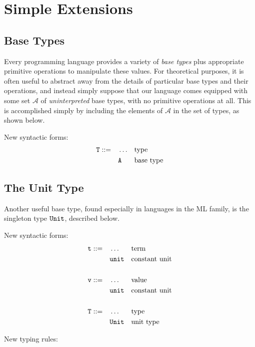 \documentclass[11pt,twoside=off,numbers=noenddot]{scrbook}
\begin{document}
\chapter{Simple Extensions}

\section{Base Types}
Every programming language provides a variety of \textit{base types}
plus appropriate primitive operations to manipulate these values. For
theoretical purposes, it is often useful to abstract away from the
details of particular base types and their operations, and instead
simply suppose that our language comes equipped with some set
$\mathcal{A}$ of \textit{uninterpreted} base types, with no primitive
operations at all. This is accomplished simply by including the
elements of $\mathcal{A}$ in the set of types, as shown below.

New syntactic forms:
\begin{align*}
  \ttt{T} ::= & \quad \dots && \text{type} \\
  & \quad \ttt{A} && \text{base type}
\end{align*}

\section{The Unit Type}
Another useful base type, found especially in languages in the ML
family, is the singleton type $\ttt{Unit}$, described below.

New syntactic forms:
\begin{align*}
  \ttt{t} ::= & \quad \dots && \text{term} \\
  & \quad \ttt{unit} && \text{constant unit} \\
  \\
  \ttt{v} ::= & \quad \dots && \text{value} \\
  & \quad \ttt{unit} && \text{constant unit} \\
  \\
  \ttt{T} ::= & \quad \dots && \text{type} \\
  & \quad \ttt{Unit} && \text{unit type}
\end{align*}

New typing rules:
\begin{prooftree}
\end{prooftree}
\end{document}

